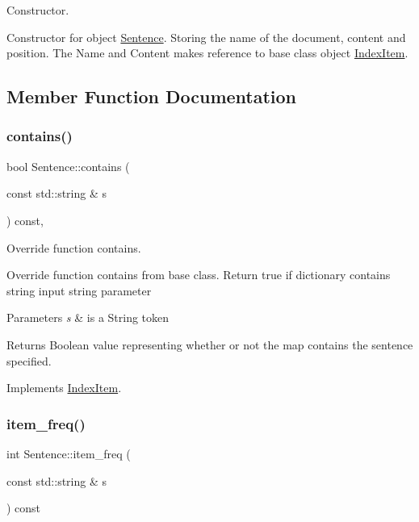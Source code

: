Constructor. 

Constructor for object \hyperlink{class_sentence}{Sentence}. Storing the name of the document, content and position. The Name and Content makes reference to base class object \hyperlink{class_index_item}{Index\+Item}. 

\subsection{Member Function Documentation}
\mbox{\label{class_sentence_a867c17dbf3ef55c8708faa120ffad162}} 
\subsubsection{\texorpdfstring{contains()}{contains()}}
{\footnotesize\ttfamily bool Sentence\+::contains (\begin{DoxyParamCaption}\item[{const std\+::string \&}]{s }\end{DoxyParamCaption}) const\hspace{0.3cm}{\ttfamily [override]}, {\ttfamily [virtual]}}



Override function contains. 

Override function contains from base class. Return true if dictionary contains string input string parameter


\begin{DoxyParams}{Parameters}
{\em s} & is a String token \\
\hline
\end{DoxyParams}
\begin{DoxyReturn}{Returns}
Boolean value representing whether or not the map contains the sentence specified. 
\end{DoxyReturn}


Implements \hyperlink{class_index_item_a534d96bf041a485ed124663b9cded2fb}{Index\+Item}.

\mbox{\label{class_sentence_af3e48fa5d5776ae122b408191d67d327}} 
\subsubsection{\texorpdfstring{item\+\_\+freq()}{item\_freq()}}
{\footnotesize\ttfamily int Sentence\+::item\+\_\+freq (\begin{DoxyParamCaption}\item[{const std\+::string \&}]{s }\end{DoxyParamCaption}) const\hspace{0.3cm}{\ttfamily [private]}}




